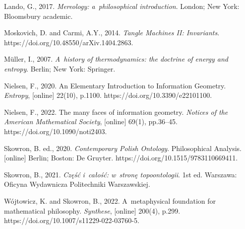 Lando, G., 2017. \textit{Mereology: a~philosophical introduction}. London; New York: Bloomsbury academic.



Moskovich, D. and Carmi, A.Y., 2014. \textit{Tangle Machines II: Invariants}. https://doi.org/10.48550/arXiv.1404.2863.



Müller, I., 2007. \textit{A~history of thermodynamics: the doctrine of energy and entropy}. Berlin; New York: Springer.



Nielsen, F., 2020. An Elementary Introduction to Information Geometry. \textit{Entropy}, [online] 22(10), p.1100. https://doi.org/10.3390/e22101100.



Nielsen, F., 2022. The many faces of information geometry. \textit{Notices of the American Mathematical Society}, [online] 69(1), pp.36–45. https://doi.org/10.1090/noti2403.



Skowron, B. ed., 2020. \textit{Contemporary Polish Ontology}. Philosophical Analysis. [online] Berlin; Boston: De Gruyter. https://doi.org/10.1515/9783110669411.



Skowron, B., 2021. \textit{Część i~całość: w~stronę topoontologii}. 1st ed. Warszawa: Oficyna Wydawnicza Politechniki Warszawskiej.



Wójtowicz, K. and Skowron, B., 2022. A~metaphysical foundation for mathematical philosophy. \textit{Synthese}, [online] 200(4), p.299. https://doi.org/10.1007/s11229-022-03760-5.



